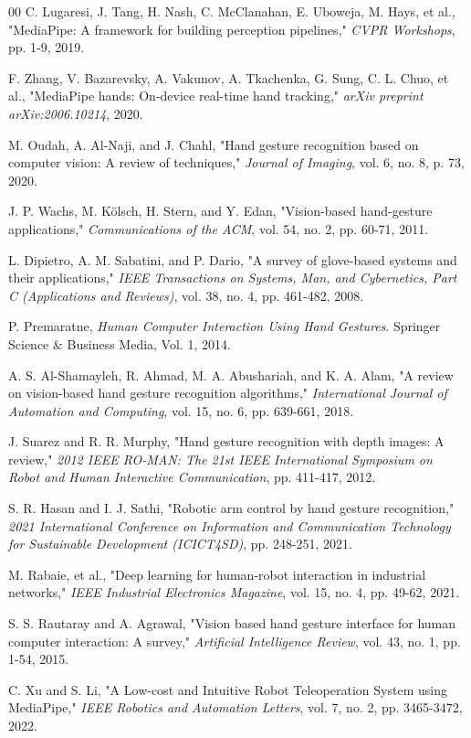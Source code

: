 \documentclass[conference]{IEEEtran}
\begin{document}
\begin{thebibliography}{00}
C. Lugaresi, J. Tang, H. Nash, C. McClanahan, E. Uboweja, M. Hays, et al., "MediaPipe: A framework for building perception pipelines," \textit{CVPR Workshops}, pp. 1-9, 2019.

F. Zhang, V. Bazarevsky, A. Vakunov, A. Tkachenka, G. Sung, C. L. Chuo, et al., "MediaPipe hands: On-device real-time hand tracking," \textit{arXiv preprint arXiv:2006.10214}, 2020.

M. Oudah, A. Al-Naji, and J. Chahl, "Hand gesture recognition based on computer vision: A review of techniques," \textit{Journal of Imaging}, vol. 6, no. 8, p. 73, 2020.

J. P. Wachs, M. Kölsch, H. Stern, and Y. Edan, "Vision-based hand-gesture applications," \textit{Communications of the ACM}, vol. 54, no. 2, pp. 60-71, 2011.

L. Dipietro, A. M. Sabatini, and P. Dario, "A survey of glove-based systems and their applications," \textit{IEEE Transactions on Systems, Man, and Cybernetics, Part C (Applications and Reviews)}, vol. 38, no. 4, pp. 461-482, 2008.

P. Premaratne, \textit{Human Computer Interaction Using Hand Gestures}. Springer Science \& Business Media, Vol. 1, 2014.

A. S. Al-Shamayleh, R. Ahmad, M. A. Abushariah, and K. A. Alam, "A review on vision-based hand gesture recognition algorithms," \textit{International Journal of Automation and Computing}, vol. 15, no. 6, pp. 639-661, 2018.

J. Suarez and R. R. Murphy, "Hand gesture recognition with depth images: A review," \textit{2012 IEEE RO-MAN: The 21st IEEE International Symposium on Robot and Human Interactive Communication}, pp. 411-417, 2012.

S. R. Hasan and I. J. Sathi, "Robotic arm control by hand gesture recognition," \textit{2021 International Conference on Information and Communication Technology for Sustainable Development (ICICT4SD)}, pp. 248-251, 2021.

M. Rabaie, et al., "Deep learning for human-robot interaction in industrial networks," \textit{IEEE Industrial Electronics Magazine}, vol. 15, no. 4, pp. 49-62, 2021.

S. S. Rautaray and A. Agrawal, "Vision based hand gesture interface for human computer interaction: A survey," \textit{Artificial Intelligence Review}, vol. 43, no. 1, pp. 1-54, 2015.

C. Xu and S. Li, "A Low-cost and Intuitive Robot Teleoperation System using MediaPipe," \textit{IEEE Robotics and Automation Letters}, vol. 7, no. 2, pp. 3465-3472, 2022.

\end{thebibliography}
\end{document}
